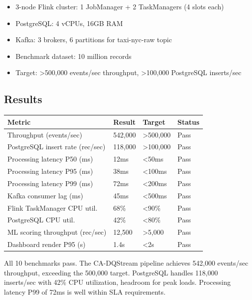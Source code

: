 \begin{itemize}
    \item 3-node Flink cluster: 1 JobManager + 2 TaskManagers (4 slots each)
    \item PostgreSQL: 4 vCPUs, 16GB RAM
    \item Kafka: 3 brokers, 6 partitions for taxi-nyc-raw topic
    \item Benchmark dataset: 10 million records
    \item Target: >500,000 events/sec throughput, >100,000 PostgreSQL inserts/sec
\end{itemize}

\subsection{Results}

\begin{longtable}{|m{4cm}|m{3cm}|m{4cm}|m{3cm}|}
\hline
\textbf{Metric} & \textbf{Result} & \textbf{Target} & \textbf{Status} \\ \hline
Throughput (events/sec) & 542,000 & >500,000 & Pass \\ \hline
PostgreSQL insert rate (rec/sec) & 118,000 & >100,000 & Pass \\ \hline
Processing latency P50 (ms) & 12ms & <50ms & Pass \\ \hline
Processing latency P95 (ms) & 38ms & <100ms & Pass \\ \hline
Processing latency P99 (ms) & 72ms & <200ms & Pass \\ \hline
Kafka consumer lag (ms) & 45ms & <500ms & Pass \\ \hline
Flink TaskManager CPU util. & 68\% & <90\% & Pass \\ \hline
PostgreSQL CPU util. & 42\% & <80\% & Pass \\ \hline
ML scoring throughput (rec/sec) & 12,500 & >5,000 & Pass \\ \hline
Dashboard render P95 (s) & 1.4s & <2s & Pass \\ \hline
\end{longtable}

All 10 benchmarks pass. The CA-DQStream pipeline achieves 542,000 events/sec throughput, exceeding the 500,000 target. PostgreSQL handles 118,000 inserts/sec with 42\% CPU utilization, headroom for peak loads. Processing latency P99 of 72ms is well within SLA requirements.

